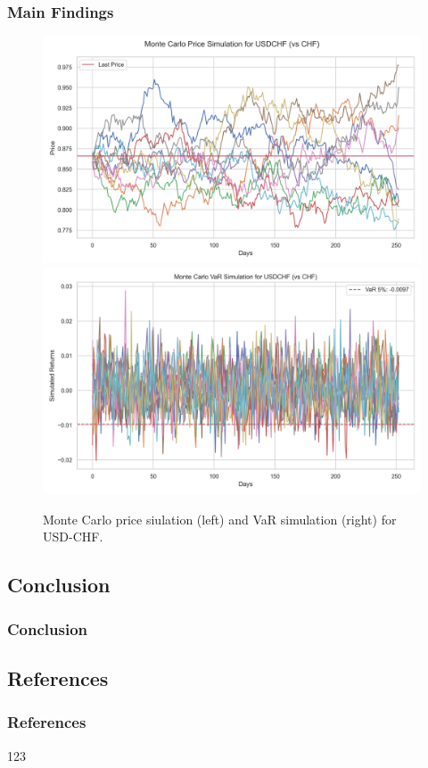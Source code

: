 \documentclass[10pt]{beamer}
\begin{document}
\begin{frame}
\frametitle{Main Findings}
\begin{figure}
    \centering  \includegraphics[width=0.48\linewidth]{reports/figures/monte_carlo_price_simulation_USDCHF_vs_CHF.png}  \label{fig:monte_carlo_price_simulation_USDCHF_vs_CHF}
    \includegraphics[width=0.49\linewidth]{reports/figures/monte_carlo_var_simulation_USDCHF_vs_CHF.png}  \label{fig:monte_carlo_var_simulation_USDCHF_vs_CHF}
    \caption{\footnotesize Monte Carlo price siulation (left) and VaR simulation (right) for USD-CHF.}
\end{figure}
\end{frame}
\begin{frame}
\section{Conclusion}
\frametitle{Conclusion}

\end{frame}
\begin{frame}
\section{References}
\frametitle{References}
\scriptsize \printbibliography
\end{frame}
\begin{frame}{123}
\end{frame}
\end{document}
